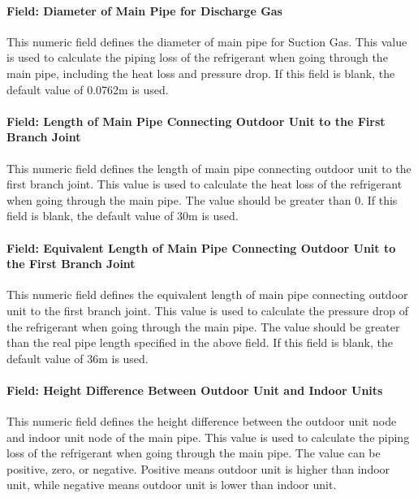 \paragraph{Field: Diameter of Main Pipe for Discharge Gas}

This numeric field defines the diameter of main pipe for Suction Gas. This value is used to calculate the piping loss of the refrigerant when going through the main pipe, including the heat loss and pressure drop. If this field is blank, the default value of 0.0762m is used.

\paragraph{Field: Length of Main Pipe Connecting Outdoor Unit to the First Branch Joint}

This numeric field defines the length of main pipe connecting outdoor unit to the first branch joint. This value is used to calculate the heat loss of the refrigerant when going through the main pipe. The value should be greater than 0. If this field is blank, the default value of 30m is used.

\paragraph{Field: Equivalent Length of Main Pipe Connecting Outdoor Unit to the First Branch Joint}

This numeric field defines the equivalent length of main pipe connecting outdoor unit to the first branch joint. This value is used to calculate the pressure drop of the refrigerant when going through the main pipe. The value should be greater than the real pipe length specified in the above field. If this field is blank, the default value of 36m is used.

\paragraph{Field: Height Difference Between Outdoor Unit and Indoor Units}

This numeric field defines the height difference between the outdoor unit node and indoor unit node of the main pipe. This value is used to calculate the piping loss of the refrigerant when going through the main pipe. The value can be positive, zero, or negative. Positive means outdoor unit is higher than indoor unit, while negative means outdoor unit is lower than indoor unit.


